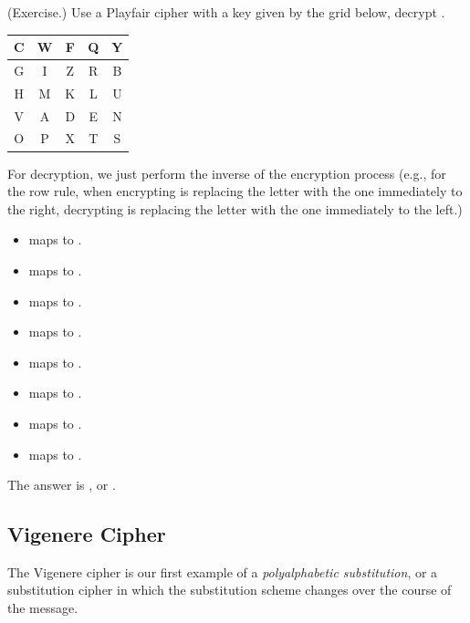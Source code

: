\documentclass[letterpaper]{article}
\begin{document}
\begin{mdframed}
    (Exercise.) Use a Playfair cipher with a key given by the grid below, decrypt .
    \begin{center}
        \begin{tabular}{|c|c|c|c|c|}
            \hline
            C & W & F & Q & Y \\ 
            \hline
            G & I & Z & R & B \\ 
            \hline
            H & M & K & L & U \\ 
            \hline
            V & A & D & E & N \\ 
            \hline
            O & P & X & T & S \\ 
            \hline
        \end{tabular}
    \end{center}

    \begin{mdframed}
        For decryption, we just perform the inverse of the encryption process (e.g., for the row rule, when encrypting is replacing the letter with the one immediately to the right, decrypting is replacing the letter with the one immediately to the left.)
        \begin{itemize}
            \item {} maps to .
            \item {} maps to .
            \item {} maps to .
            \item {} maps to .
            \item {} maps to .
            \item {} maps to .
            \item {} maps to .
            \item {} maps to .
        \end{itemize}
        The answer is , or .
    \end{mdframed}
\end{mdframed}


\subsection{Vigenere Cipher}
The Vigenere cipher is our first example of a \emph{polyalphabetic substitution}, or a substitution cipher in which the substitution scheme changes over the course of the message.
\end{document}
